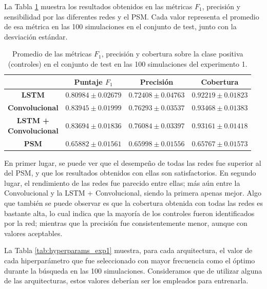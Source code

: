 \documentclass[../../main.tex]{subfiles}
\begin{document}
La Tabla \ref{tab:results_exp1} muestra los resultados obtenidos en las métricas \(F_1\),
precisión y sensibilidad por las diferentes redes y el PSM. Cada valor representa el
promedio de esa métrica en las 100 simulaciones en el conjunto de test, junto con la
desviación estándar.

\begin{table}[H]
    \centering
    \renewcommand{\arraystretch}{1.2}
    \begin{tabular}{|c|c|c|c|}
        \hline
         & \textbf{Puntaje} \(F_1\) & \textbf{Precisión} & \textbf{Cobertura} \\ \hline\hline
        \textbf{LSTM}
            & $0.80984 \pm 0.02679$ & $0.72408 \pm 0.04763$ & $0.92219 \pm 0.01823$ \\ \hline
        \textbf{Convolucional}
            & $\mathbf{0.83945 \pm 0.01999}$ & $\mathbf{0.76293 \pm 0.03537}$ & $\mathbf{0.93468 \pm 0.01383}$ \\ \hline
        \makecell{\textbf{LSTM +}\\\textbf{Convolucional}}
            & $0.83694 \pm 0.01836$ & $0.76084 \pm 0.03397$ & $0.93161 \pm 0.01418$ \\ \hline
        \textbf{PSM}
            & $0.65882 \pm 0.01561$ & $0.65998 \pm 0.01556$ & $0.65767 \pm 0.01573$ \\
        \hline
    \end{tabular}

    \caption{Promedio de las métricas \(F_1\), precisión y cobertura sobre la
    clase positiva (controles) en el conjunto de test en las 100 simulaciones del
    experimento 1.}
    \label{tab:results_exp1}
\end{table}

En primer lugar, se puede ver que el desempeño de todas las redes fue superior al del PSM,
y que los resultados obtenidos con ellas son satisfactorios. En segundo lugar, el
rendimiento de las redes fue parecido entre ellas; más aún entre la Convolucional y la
LSTM + Convolucional, siendo la primera apenas mejor. Algo que también se puede observar
es que la cobertura obtenida con todas las redes es bastante alta, lo cual indica que
la mayoría de los controles fueron identificados por la red; mientras que la precisión fue
consistentemente menor, aunque con valores aceptables.

La Tabla \ref{tab:hyperparams_exp1} muestra, para cada arquitectura, el valor de cada
hiperparámetro que fue seleccionado con mayor frecuencia como el óptimo durante la
búsqueda en las 100 simulaciones. Consideramos que de utilizar alguna de las
arquitecturas, estos valores deberían ser los empleados para entrenarla.
\end{document}
